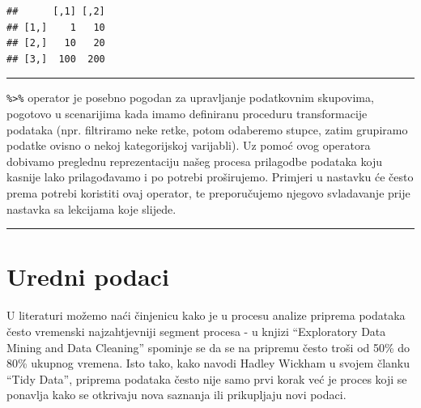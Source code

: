 \documentclass[]{book}
\newenvironment{Shaded}{\begin{snugshade}}{\end{snugshade}}
\newcommand{\KeywordTok}[1]{\textcolor[rgb]{0.13,0.29,0.53}{\textbf{#1}}}
\newcommand{\DataTypeTok}[1]{\textcolor[rgb]{0.13,0.29,0.53}{#1}}
\newcommand{\DecValTok}[1]{\textcolor[rgb]{0.00,0.00,0.81}{#1}}
\newcommand{\StringTok}[1]{\textcolor[rgb]{0.31,0.60,0.02}{#1}}
\newcommand{\ControlFlowTok}[1]{\textcolor[rgb]{0.13,0.29,0.53}{\textbf{#1}}}
\newcommand{\OperatorTok}[1]{\textcolor[rgb]{0.81,0.36,0.00}{\textbf{#1}}}
\newcommand{\NormalTok}[1]{#1}
\theoremstyle{definition}
\theoremstyle{definition}
\theoremstyle{definition}
\theoremstyle{remark}
\begin{document}
\begin{Shaded}
\end{Shaded}

\begin{verbatim}
##      [,1] [,2]
## [1,]    1   10
## [2,]   10   20
## [3,]  100  200
\end{verbatim}

\begin{center}\rule{0.5\linewidth}{\linethickness}\end{center}

\texttt{\%\textgreater{}\%} operator je posebno pogodan za upravljanje
podatkovnim skupovima, pogotovo u scenarijima kada imamo definiranu
proceduru transformacije podataka (npr. filtriramo neke retke, potom
odaberemo stupce, zatim grupiramo podatke ovisno o nekoj kategorijskoj
varijabli). Uz pomoć ovog operatora dobivamo preglednu reprezentaciju
našeg procesa prilagodbe podataka koju kasnije lako prilagođavamo i po
potrebi proširujemo. Primjeri u nastavku će često prema potrebi
koristiti ovaj operator, te preporučujemo njegovo svladavanje prije
nastavka sa lekcijama koje slijede.

\begin{center}\rule{0.5\linewidth}{\linethickness}\end{center}

\section{Uredni podaci}\label{uredni-podaci}

U literaturi možemo naći činjenicu kako je u procesu analize priprema
podataka često vremenski najzahtjevniji segment procesa - u knjizi
``Exploratory Data Mining and Data Cleaning'' spominje se da se na
pripremu često troši od 50\% do 80\% ukupnog vremena. Isto tako, kako
navodi Hadley Wickham u svojem članku ``Tidy Data'', priprema podataka
često nije samo prvi korak već je proces koji se ponavlja kako se
otkrivaju nova saznanja ili prikupljaju novi podaci.
\end{document}
